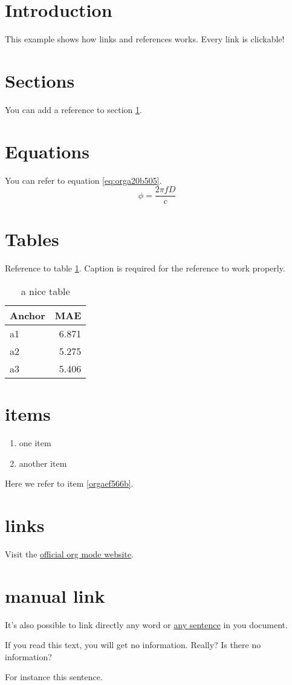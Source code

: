 


\section{Introduction}
\label{sec:org945f6fc}
This example shows how links and references works.
Every link is clickable!

\section{Sections}
\label{sec:org7978065}
You can add a reference to section \ref{sec:org945f6fc}.

\section{Equations}
\label{sec:org7a73fc9}
You can refer to equation \ref{eq:orga20b505}.
\begin{equation}
\label{eq:orga20b505}
\phi = \frac{2\pi fD}{c}
\end{equation}

\section{Tables}
\label{sec:orgcae7570}
Reference to table \ref{tab:orgcf9529f}.
Caption is required for the reference to work properly.

\begin{table}[htbp]
\caption{\label{tab:orgcf9529f}
a nice table}
\centering
\begin{tabular}{lr}
Anchor & MAE\\
\hline
a1 & 6.871\\
a2 & 5.275\\
a3 & 5.406\\
\end{tabular}
\end{table}

\section{items}
\label{sec:org9f4f6ae}
\begin{enumerate}
\item one item
\item \label{orgaef566b}another item
\end{enumerate}
Here we refer to item \ref{orgaef566b}.

\section{links}
\label{sec:org4d4707d}
Visit the \href{https://orgmode.org/}{official org mode website}.

\section{manual link}
\label{sec:org9833794}
It's also possible to link directly any word
or \hyperlink{thesentence}{any sentence} in you document.

If you read this text, you will get no information.  Really?
Is there no information?

For instance \hypertarget{thesentence}{this sentence}.


